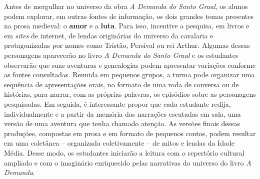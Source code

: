 \documentclass[11pt]{extarticle}
\begin{document}
Antes de mergulhar no universo da obra \emph{A Demanda do Santo
Graal}, os alunos podem explorar, em outras fontes de informação, os
dois grandes temas presentes na prosa medieval: o \textbf{amor} e a
\textbf{luta}. Para isso, incentive a pesquisa, em livros e em
\emph{sites} de internet, de lendas originárias do universo da cavalaria
e protagonizadas por nomes como Tristão, Persival ou rei Arthur. Algumas
dessas personagens aparecerão no livro \emph{A Demanda do Santo Graal} e os
estudantes observarão que suas aventuras e genealogias podem apresentar
variações conforme as fontes consultadas. Reunida em pequenos grupos, a
turma pode organizar uma sequência de apresentações orais, no formato de
uma roda de conversa ou de histórias, para narrar, com as
próprias palavras, os episódios sobre as personagens pesquisadas. Em
seguida, é interessante propor que cada estudante redija,
individualmente e a partir da memória das narrações escutadas em sala,
uma versão de uma aventura que tenha chamado atenção. As versões finais
dessas produções, compostas em prosa e em formato de pequenos contos,
podem resultar em uma coletânea -- organizada coletivamente -- de mitos
e lendas da Idade Média. Desse modo, os estudantes iniciarão a leitura
com o repertório cultural ampliado e com o imaginário enriquecido pelas
narrativas do universo do livro \emph{A Demanda}.
\end{document}
